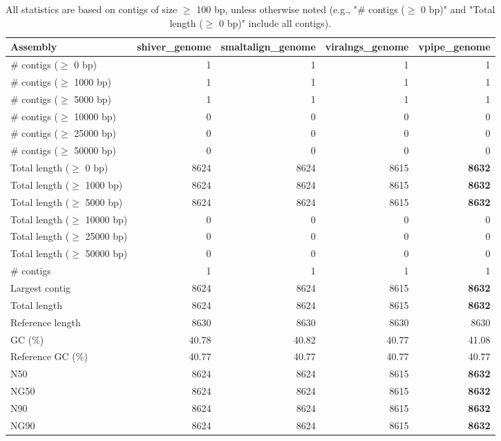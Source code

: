\documentclass[12pt,a4paper]{article}
\begin{document}
\begin{table}[ht]
\begin{center}
\caption{All statistics are based on contigs of size $\geq$ 100 bp, unless otherwise noted (e.g., "\# contigs ($\geq$ 0 bp)" and "Total length ($\geq$ 0 bp)" include all contigs).}
\begin{tabular}{|l*{4}{|r}|}
\hline
Assembly & shiver\_genome & smaltalign\_genome & viralngs\_genome & vpipe\_genome \\ \hline
\# contigs ($\geq$ 0 bp) & 1 & 1 & 1 & 1 \\ \hline
\# contigs ($\geq$ 1000 bp) & 1 & 1 & 1 & 1 \\ \hline
\# contigs ($\geq$ 5000 bp) & 1 & 1 & 1 & 1 \\ \hline
\# contigs ($\geq$ 10000 bp) & 0 & 0 & 0 & 0 \\ \hline
\# contigs ($\geq$ 25000 bp) & 0 & 0 & 0 & 0 \\ \hline
\# contigs ($\geq$ 50000 bp) & 0 & 0 & 0 & 0 \\ \hline
Total length ($\geq$ 0 bp) & 8624 & 8624 & 8615 & {\bf 8632} \\ \hline
Total length ($\geq$ 1000 bp) & 8624 & 8624 & 8615 & {\bf 8632} \\ \hline
Total length ($\geq$ 5000 bp) & 8624 & 8624 & 8615 & {\bf 8632} \\ \hline
Total length ($\geq$ 10000 bp) & 0 & 0 & 0 & 0 \\ \hline
Total length ($\geq$ 25000 bp) & 0 & 0 & 0 & 0 \\ \hline
Total length ($\geq$ 50000 bp) & 0 & 0 & 0 & 0 \\ \hline
\# contigs & 1 & 1 & 1 & 1 \\ \hline
Largest contig & 8624 & 8624 & 8615 & {\bf 8632} \\ \hline
Total length & 8624 & 8624 & 8615 & {\bf 8632} \\ \hline
Reference length & 8630 & 8630 & 8630 & 8630 \\ \hline
GC (\%) & 40.78 & 40.82 & 40.77 & 41.08 \\ \hline
Reference GC (\%) & 40.77 & 40.77 & 40.77 & 40.77 \\ \hline
N50 & 8624 & 8624 & 8615 & {\bf 8632} \\ \hline
NG50 & 8624 & 8624 & 8615 & {\bf 8632} \\ \hline
N90 & 8624 & 8624 & 8615 & {\bf 8632} \\ \hline
NG90 & 8624 & 8624 & 8615 & {\bf 8632} \\ \hline

\end{tabular}
\end{center}
\end{table}
\end{document}
